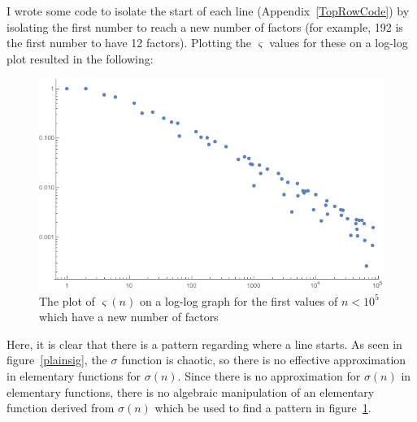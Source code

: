 \documentclass[12pt]{article}
\begin{document}
			I wrote some code to isolate the start of each line (Appendix~\ref{TopRowCode}) by isolating the first number to reach a new number of factors (for example, 192 is the first number to have 12 factors). Plotting the $\varsigma$ values for these on a log-log plot resulted in the following:
			\begin{figure}[H]
				\includegraphics[width=1.0\textwidth]{../Images/toprow.png}
				\caption{The plot of $\varsigma(n)$ on a log-log graph for the first values of $n<10^5$ which have a new number of factors
				\label{TRP}}
			\end{figure}
			Here, it is clear that there is a pattern regarding where a line starts. As seen in figure~\ref{plainsig}, the $\sigma$ function is chaotic, so there is no effective approximation in elementary functions for $\sigma(n)$. Since there is no approximation for $\sigma(n)$ in elementary functions, there is no algebraic manipulation of an elementary function derived from $\sigma(n)$ which be used to find a pattern in figure~\ref{TRP}.
\end{document}
